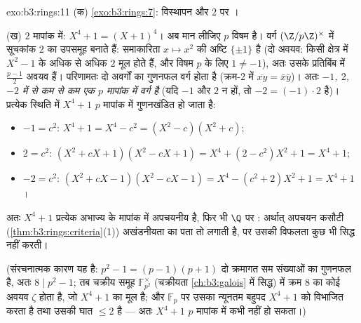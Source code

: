 \begin{solution}{exo:b3:rings:11}
(क) \cref{exo:b3:rings:7}: विस्थापन और $2$ पर ।

(ख) $2$ मापांक में: $X^4 + 1 = (X + 1)^4$। अब मान लीजिए $p$ विषम है। वर्ग $(\Z/p\Z)^\times$
में सूचकांक $2$ का उपसमूह बनाते हैं: समाकारिता $x \mapsto x^2$ की अष्टि
$\{\pm 1\}$ है (दो अवयव: किसी क्षेत्र में $X^2
- 1$ के अधिक से अधिक $2$ मूल
होते हैं, और विषम $p$ के लिए $1 \neq -1$), अतः उसके प्रतिबिंब में $\frac{p-1}2$
अवयव हैं। परिणामतः दो अवर्गों का गुणनफल वर्ग होता है (क्रम-$2$
 में $\overline{xy} = \bar x\bar y$)। अतः \emph{$-1$, $2$, $-2$ में से कम से
कम एक $p$ मापांक में वर्ग है} (यदि $-1$ और $2$ न हों, तो $-2 = (-1)\cdot 2$
है)। प्रत्येक स्थिति में $X^4 + 1$ $p$ मापांक में गुणनखंडित हो जाता
है:
\begin{itemize}
  \item $-1 = c^2$: \quad $X^4 + 1 = X^4 - c^2 = (X^2 - c)(X^2 +
        c)$;
  \item $2 = c^2$: \quad $(X^2 + cX + 1)(X^2 - cX + 1) = X^4 + (2
        - c^2)X^2 + 1 = X^4 + 1$;
  \item $-2 = c^2$: \quad $(X^2 + cX - 1)(X^2 - cX - 1) = X^4 -
        (c^2 + 2)X^2 + 1 = X^4 + 1$।
\end{itemize}
अतः $X^4+1$ प्रत्येक अभाज्य के मापांक में अपचयनीय है, फिर भी $\Q$ पर
: अर्थात् अपचयन कसौटी (\cref{thm:b3:rings:criteria}(1)) अखंडनीयता का पता तो लगाती
है, पर उसकी विफलता कुछ भी सिद्ध नहीं करती।

(संरचनात्मक कारण यह है: $p^2 - 1 = (p-1)(p+1)$ दो क्रमागत सम संख्याओं का गुणनफल है,
अतः $8 \mid p^2 - 1$; तब चक्रीय समूह $\mathbb F_{p^2}^\times$ (चक्रीयता \cref{ch:b3:galois} में सिद्ध) में क्रम
$8$ का कोई अवयव $\zeta$ होता है, जो $X^4 + 1$ का मूल है; और $\mathbb
F_p$ पर
उसका न्यूनतम बहुपद $X^4+1$ को विभाजित करता है तथा उसकी घात $\leq 2$ है
--- अतः $X^4+1$ $p$ मापांक में कभी  नहीं हो सकता।)
\end{solution}

